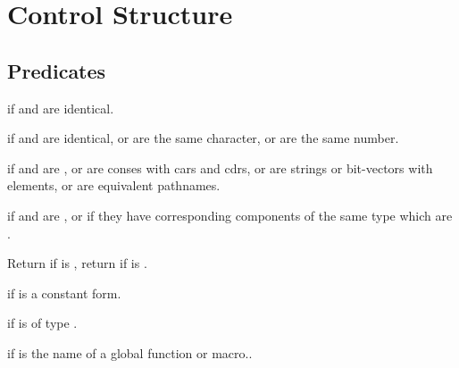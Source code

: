 %
%

\section{Control Structure}

\subsection{Predicates}
\begin{LIST}{1cm}

  \retval{\T} if  and  are identical.

  \retval{\T} if  and 
  are identical, or are the same character, or are the same number.

  \retval{\T} if  and 
  are , or are conses with  cars and cdrs, or are
  strings or bit-vectors with   elements, or are equivalent pathnames.

  \retval{\T} if  and 
  are , or if they have corresponding components of the same
  type which are .

  Return \retval{\NIL} if  is \T, return \retval{\T} if  is \NIL.

  \retval{\T} if  is a constant form.

  \retval{\T} if  is of type .

  \retval{\T} if  is the name of a global function or macro..


\end{LIST}


